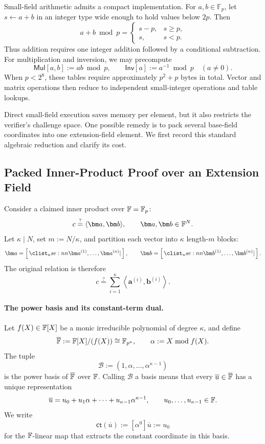 \documentclass[runningheads]{llncs}
\begin{document}
Small-field arithmetic admits a compact implementation.  For
\(a,b\in\mathbb F_p\), let \(s\leftarrow a+b\) in an integer type wide
enough to hold values below \(2p\).  Then
\[
    a+b\bmod p
    =
    \begin{cases}
        s-p, & s\ge p,\\
        s,   & s<p.
    \end{cases}
\]
Thus addition requires one integer addition followed by a conditional
subtraction.  For multiplication and inversion, we may precompute
\[
    \mathsf{Mul}[a,b]:=ab\bmod p,
    \qquad
    \mathsf{Inv}[a]:=a^{-1}\bmod p
    \quad(a\ne0).
\]
When \(p<2^8\), these tables require approximately \(p^2+p\) bytes in
total.  Vector and matrix operations then reduce to independent
small-integer operations and table lookups.

Direct small-field execution saves memory per element, but it also
restricts the verifier's challenge space.  One possible remedy is to
pack several base-field coordinates into one extension-field element.
We first record this standard algebraic reduction and clarify its cost.

\subsection{Packed Inner-Product Proof over an Extension Field}
\label{sec:extension-inner-product}

Consider a claimed inner product over \({\mathbb{F}}=\mathbb F_p\):
\[
    c\stackrel{?}{=}\langle\bm a,\bm b\rangle,
    \qquad
    \bm a,\bm b\in\Field^N.
\]
Let \(\kappa\mid N\), set \(m:=N/\kappa\), and partition each vector
into \(\kappa\) length-\(m\) blocks:
\[
    \bm a=
      \concat{\bm a^{(1)},\ldots,\bm a^{(\kappa)}},
    \qquad
    \bm b=
      \concat{\bm b^{(1)},\ldots,\bm b^{(\kappa)}}.
\]
The original relation is therefore
\begin{equation}
    c\stackrel{?}{=}
      \sum_{i=1}^{\kappa}
      \left\langle\bm a^{(i)},\bm b^{(i)}\right\rangle.
\label{eq:extension-packed-base-relation}
\end{equation}

\paragraph{The power basis and its constant-term dual.}
Let \(f(X)\in{\mathbb{F}}[X]\) be a monic irreducible polynomial of degree
\(\kappa\), and define
\[
    \overline{{\mathbb{F}}}
      :={\mathbb{F}}[X]/(f(X))
      \cong\mathbb F_{p^\kappa},
    \qquad
    \alpha:=X\bmod f(X).
\]
The tuple
\begin{equation}
    \mathcal B
      :=(1,\alpha,\ldots,\alpha^{\kappa-1})
\label{eq:extension-power-basis}
\end{equation}
is the power basis of \(\overline{{\mathbb{F}}}\) over \({\mathbb{F}}\).  Calling
\(\mathcal B\) a basis means that every
\(\overline u\in\overline{{\mathbb{F}}}\) has a unique representation
\[
    \overline u
      =u_0+u_1\alpha+\cdots+u_{\kappa-1}\alpha^{\kappa-1},
    \qquad
    u_0,\ldots,u_{\kappa-1}\in{\mathbb{F}}.
\]
We write
\[
    \mathsf{ct}(\overline u)
      :=[\alpha^0]\overline u
      :=u_0
\]
for the \({\mathbb{F}}\)-linear map that extracts the constant coordinate in
this basis.
\end{document}
